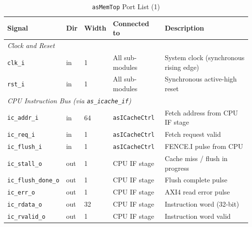 \begin{table}[H]
\caption{\texttt{asMemTop} Port List (1)}
\label{tab:asMemTopPorts}
\centering
\begin{tabularx}{\textwidth}{|l |l |l |l |X|}
  \hline
  Signal & Dir & Width & Connected to & Description \\
  \hline
  \hline
  \multicolumn{5}{|l|}{\textit{Clock and Reset}} \\
  \hline
  \texttt{clk\_i}  & in & 1 & All sub-modules & System clock (synchronous rising edge) \\
  \hline
  \texttt{rst\_i}  & in & 1 & All sub-modules & Synchronous active-high reset \\
  \hline
  \multicolumn{5}{|l|}{\textit{CPU Instruction Bus (via \texttt{as\_icache\_if})}} \\
  \hline
  \texttt{ic\_addr\_i}        & in  & 64 & \texttt{asICacheCtrl} & Fetch address from CPU IF stage \\
  \hline
  \texttt{ic\_req\_i}         & in  & 1  & \texttt{asICacheCtrl} & Fetch request valid \\
  \hline
  \texttt{ic\_flush\_i}       & in  & 1  & \texttt{asICacheCtrl} & FENCE.I pulse from CPU \\
  \hline
  \texttt{ic\_stall\_o}       & out & 1  & CPU IF stage          & Cache miss / flush in progress \\
  \hline
  \texttt{ic\_flush\_done\_o} & out & 1  & CPU IF stage          & Flush complete pulse \\
  \hline
  \texttt{ic\_err\_o}         & out & 1  & CPU IF stage          & AXI4 read error pulse \\
  \hline
  \texttt{ic\_rdata\_o}       & out & 32 & CPU IF stage          & Instruction word (32-bit) \\
  \hline
  \texttt{ic\_rvalid\_o}      & out & 1  & CPU IF stage          & Instruction word valid \\
  \hline
\end{tabularx}
\end{table}

